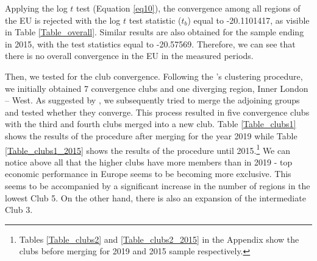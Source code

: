 \documentclass[11pt]{article}
\begin{document}
Applying the log $t$ test (Equation \ref{eq10}), the convergence among all regions of the EU is rejected with the log $t$ test statistic ($t_b$) equal to -20.1101417, as visible in Table \ref{Table_overall}. Similar results are also obtained for the sample ending in 2015, with the test statistics equal to -20.57569. Therefore, we can see that there is no overall convergence in the EU in the measured periods.

Then, we tested for the club convergence. Following the \citeauthor{phillips2007transition}'s clustering procedure, we initially obtained 7 convergence clubs and one diverging region, Inner London – West. As suggested by \citet{bartkowska2012regional}, we subsequently tried to merge the adjoining groups and tested whether they converge. This process resulted in five convergence clubs with the third and fourth clubs merged into a new club. Table \ref{Table_clubs1} shows the results of the procedure after merging for the year 2019 while Table \ref{Table_clubs1_2015} shows the results of the \citeauthor{phillips2007transition} procedure until 2015.\footnote{Tables \ref{Table_clubs2} and \ref{Table_clubs2_2015} in the Appendix show the clubs before merging for 2019 and 2015 sample respectively.}  We can notice above all that the higher clubs have more members than in 2019 - top economic performance in Europe seems to be becoming more exclusive. This seems to be accompanied by a significant increase in the number of regions in the lowest Club 5. On the other hand, there is also an expansion of the intermediate Club 3.

\begin{table}[!htbp] \centering 
 \caption{Convergence club classification after merging} 
  \label{Table_clubs1} 
\end{table}
\end{document}
